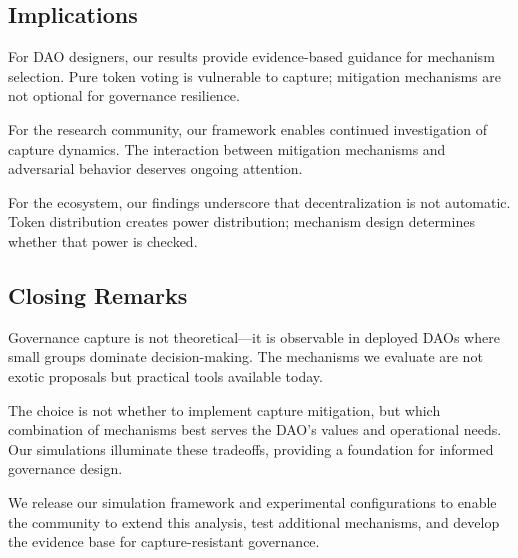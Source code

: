 \subsection{Implications}

For DAO designers, our results provide evidence-based guidance for mechanism selection. Pure token voting is vulnerable to capture; mitigation mechanisms are not optional for governance resilience.

For the research community, our framework enables continued investigation of capture dynamics. The interaction between mitigation mechanisms and adversarial behavior deserves ongoing attention.

For the ecosystem, our findings underscore that decentralization is not automatic. Token distribution creates power distribution; mechanism design determines whether that power is checked.

\subsection{Closing Remarks}

Governance capture is not theoretical---it is observable in deployed DAOs where small groups dominate decision-making. The mechanisms we evaluate are not exotic proposals but practical tools available today.

The choice is not whether to implement capture mitigation, but which combination of mechanisms best serves the DAO's values and operational needs. Our simulations illuminate these tradeoffs, providing a foundation for informed governance design.

We release our simulation framework and experimental configurations to enable the community to extend this analysis, test additional mechanisms, and develop the evidence base for capture-resistant governance.
